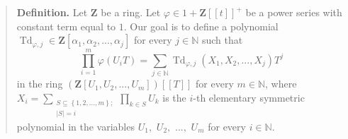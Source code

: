 \documentclass[numbers=enddot,12pt,final,onecolumn,notitlepage]{scrartcl}%
\begin{document}
\begin{quote}
\textbf{Definition.} Let $\mathbf{Z}$ be a ring. Let $\varphi\in
1+\mathbf{Z}\left[  \left[  t\right]  \right]  ^{+}$ be a power series with
constant term equal to $1$. Our goal is to define a polynomial
$\operatorname*{Td}_{\varphi,j}\in\mathbf{Z}\left[  \alpha_{1},\alpha
_{2},...,\alpha_{j}\right]  $ for every $j\in\mathbb{N}$ such that%
\begin{equation}
\prod\limits_{i=1}^{m}\varphi\left(  U_{i}T\right)  =\sum_{j\in\mathbb{N}%
}\operatorname*{Td}\nolimits_{\varphi,j}\left(  X_{1},X_{2},...,X_{j}\right)
T^{j} \label{Td1}%
\end{equation}
in the ring $\left(  \mathbf{Z}\left[  U_{1},U_{2},...,U_{m}\right]  \right)
\left[  \left[  T\right]  \right]  $ for every $m\in\mathbb{N}$, where
$X_{i}=\sum\limits_{\substack{S\subseteq\left\{  1,2,...,m\right\}
;\\\left\vert S\right\vert =i}}\prod\limits_{k\in S}U_{k}$ is the $i$-th
elementary symmetric polynomial in the variables $U_{1},$ $U_{2},$ $...,$
$U_{m}$ for every $i\in\mathbb{N}$.


\end{quote}
\end{document}

